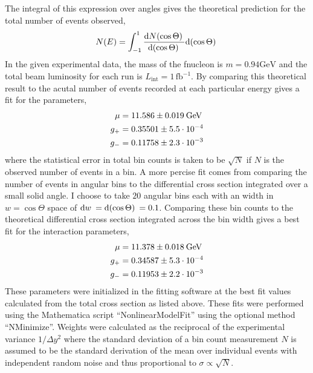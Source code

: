 \documentclass[12pt]{article}
\begin{document}
The integral of this expression over angles gives the theoretical prediction for the total number of events observed,
\[ N(E) = \int_{-1}^{1}  \frac{\mathrm{d}N( \cos{\Theta} ) \:}{\mathrm{d}(\cos{\Theta}) \:} \mathrm{d}(\cos{\Theta}) \: \]
In the given experimental data, the mass of the fnucleon is $m = 0.94 \mathrm{GeV}$ and the total beam luminosity for each run is $L_{\text{int}} = 1 \, \text{fb}^{-1}$.  
By comparing this theoretical result to the acutal number of events recorded at each particular energy gives a fit for the parameters, 
\begin{align*}
\mu & = 11.586 \pm 0.019 \: \mathrm{GeV}
\\
g_{+} & = 0.35501 \pm 5.5 \cdot 10^{-4} 
\\
g_{-} & = 0.11758 \pm 2.3 \cdot 10^{-3}
\end{align*}
where the statistical error in total bin counts is taken to be $\sqrt{N}$ if $N$ is the observed number of events in a bin. A more percise fit comes from comparing the number of events in angular bins to the differential cross section integrated over a small solid angle. I choose to take $20$ angular bins each with an width in $w = \cos{\Theta}$ space of $\mathrm{d}w \: = \mathrm{d}(\cos{\Theta}) \: = 0.1$. Comparing these bin counts to the theoretical differential cross section integrated across the bin width gives a best fit for the interaction parameters,
\begin{align*}
\mu & = 11.378 \pm 0.018 \: \mathrm{GeV}
\\
g_{+} & = 0.34587 \pm 5.3 \cdot 10^{-4} 
\\
g_{-} & = 0.11953 \pm 2.2 \cdot 10^{-3}
\end{align*}
These parameters were initialized in the fitting software at the best fit values calculated from the total cross section as listed above.
These fits were performed using the Mathematica script ``NonlinearModelFit'' using the optional method ``NMinimize''. Weights were calculated as the reciprocal of the experimental variance $1/\Delta y^2$ where the standard deviation of a bin count measurement $N$ is assumed to be the standard derivation of the mean over individual events with independent random noise and thus proportional to $\sigma \propto \sqrt{N}$.       
\end{document}
